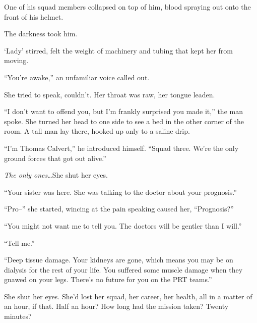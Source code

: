 One of his squad members collapsed on top of him, blood spraying out onto the front of his helmet.



The darkness took him.



\sectionbreak



`Lady' stirred, felt the weight of machinery and tubing that kept her from moving.



``You're awake,'' an unfamiliar voice called out.



She tried to speak, couldn't.  Her throat was raw, her tongue leaden.



``I don't want to offend you, but I'm frankly surprised you made it,'' the man spoke.  She turned her head to one side to see a bed in the other corner of the room.  A tall man lay there, hooked up only to a saline drip.



``I'm Thomas Calvert,'' he introduced himself.  ``Squad three.  We're the only ground forces that got out alive.''



\emph{The only ones}\ldots  She shut her eyes.



``Your sister was here.  She was talking to the doctor about your prognosis.''



``Pro--'' she started, wincing at the pain speaking caused her, ``Prognosis?''



``You might not want me to tell you.  The doctors will be gentler than I will.''



``Tell me.''



``Deep tissue damage.  Your kidneys are gone, which means you may be on dialysis for the rest of your life.  You suffered some muscle damage when they gnawed on your legs.  There's no future for you on the PRT teams.''



She shut her eyes.  She'd lost her squad, her career, her health, all in a matter of an hour, if that.  Half an hour?  How long had the mission taken?  Twenty minutes?



